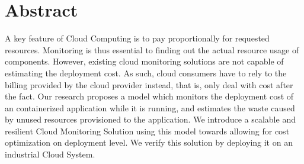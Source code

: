 \begingroup
\let\clearpage\relax
\let\cleardoublepage\relax
\let\cleardoublepage\relax

\chapter*{Abstract}
A key feature of Cloud Computing is to pay proportionally for requested resources. Monitoring is thus essential to finding out the actual resource usage of components. However, existing cloud monitoring solutions are not capable of estimating the deployment cost.
As such, cloud consumers have to rely to the billing provided by the cloud provider instead, that is, only deal with cost after the fact.
Our research proposes a model which monitors the deployment cost of an containerized application while it is running, and estimates the waste caused by unused resources provisioned to the application. 
We introduce a scalable and resilient Cloud Monitoring Solution using this model towards allowing for cost optimization on deployment level. We verify this solution by deploying it on an industrial Cloud System.
\vfill

\endgroup

\vfill
